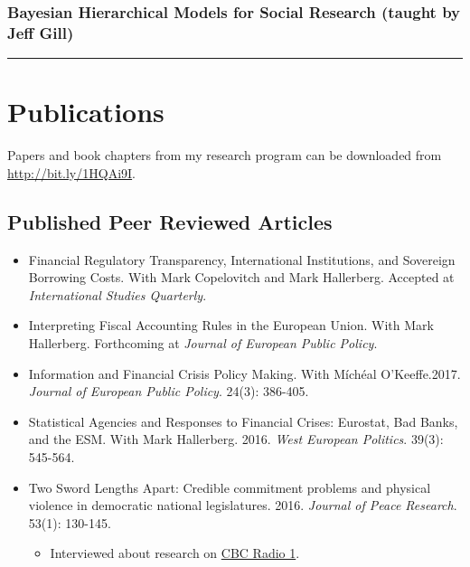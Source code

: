 \documentclass[a4paper]{article}
\begin{document}
{\subsubsection*{Bayesian Hierarchical Models for Social Research (taught by Jeff Gill)}

\vspace{0.25cm}
\medskip\hrule height 1pt
\vspace{0.5cm}


\section*{Publications}

\noindent Papers and book chapters from my research program can be downloaded from {\url{http://bit.ly/1HQAi9I}}.

\subsection*{Published Peer Reviewed Articles}

\begin{itemize}

    \item Financial Regulatory Transparency, International Institutions, and Sovereign Borrowing Costs. With Mark Copelovitch and Mark Hallerberg. Accepted at \emph{International Studies Quarterly}.

    \item Interpreting Fiscal Accounting Rules in the European Union. With Mark Hallerberg. Forthcoming at \emph{Journal of European Public Policy}.

    \item Information and Financial Crisis Policy Making. With M\'{i}ch\'{e}al O'Keeffe.2017. \emph{Journal of European Public Policy}. 24(3): 386-405.

    \item Statistical Agencies and Responses to Financial Crises: Eurostat, Bad Banks, and the ESM. With Mark Hallerberg. 2016. {\emph{West European Politics}}. 39(3): 545-564.

    \item Two Sword Lengths Apart: Credible commitment problems and physical violence in democratic national legislatures. 2016. \emph{Journal of Peace Research}. 53(1): 130-145.

        \begin{itemize}
            \item Interviewed about research on \href{http://www.cbc.ca/radio/day6/episode-286-parliamentary-brawls-transgender-rights-the-raptors-secret-weapon-migrant-ships-and-more-1.3591232/you-thought-elbowgate-was-bad-check-out-these-political-brawls-1.3591248}{CBC Radio 1}.


\end{itemize}
\end{itemize}}
\end{document}
